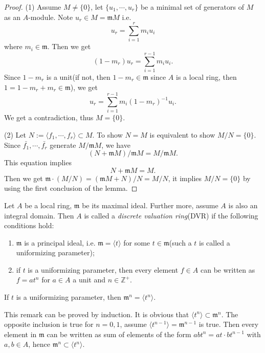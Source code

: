 \begin{proof}
	(1) Assume $ M\neq \lbrace 0 \rbrace $, let $ \lbrace u_1,\cdots,u_r\rbrace $ be a minimal set of generators of $ M $ as an $ A $-module.  Note $ u_r\in M=\mathfrak{m}M $ i.e.
	$$
		u_r=\sum\limits_{i=1}^{r}m_iu_i
	$$
	where $ m_i\in \mathfrak{m} $. Then we get
	$$
		(1-m_r)u_r=\sum\limits_{i=1}^{r-1}m_iu_i.
	$$
	Since $ 1-m_r $ is a unit(if not, then $ 1-m_r \in \mathfrak{m} $ since $A$ is a local ring, then $ 1=1-m_r+m_r\in \mathfrak{m} $), we get
	$$
		u_r=\sum\limits_{i=1}^{r-1}m_i(1-m_r)^{-1}u_i.
	$$
	We get a contradiction, thus $ M=\lbrace 0 \rbrace $.

	(2) Let $ N:=\langle f_1,\cdots,f_r \rangle\subset M $. To show $ N=M $ is equivalent to show $ M/N=\lbrace 0 \rbrace $. Since $ \bar{f_1},\cdots,\bar{f_r} $ generate $ M/\mathfrak{m}M $, we have
	$$
		(N+\mathfrak{m}M)/\mathfrak{m}M=M/\mathfrak{m}M.
	$$
	This equation implies
	$$
		N+\mathfrak{m}M=M.
	$$
	Then we get $ \mathfrak{m}\cdot (M/N)=(\mathfrak{m}M+N)/N=M/N $, it implies $ M/N=\lbrace 0\rbrace $ by using the first conclusion of the lemma.
\end{proof}
\begin{definition}
	Let $ A $ be a local ring, $ \mathfrak{m} $ be its maximal ideal. Further more, assume $ A $ is also an integral domain. Then $ A $ is called a \textit{discrete valuation ring}(DVR)  if the following conditions hold:
	\begin{enumerate}
		\item $ \mathfrak{m} $ is a principal ideal, i.e. $ \mathfrak{m}=\langle t\rangle $ for some $ t\in \mathfrak{m} $(such a $ t $ is called a uniformizing parameter);
		\item if $ t $ is a uniformizing parameter, then every element $ f\in A $ can be written as $ f=at^n $ for $ a\in A $ a unit and  $ n\in \mathbb{Z}^+ $.
	\end{enumerate}
\end{definition}
\begin{remark}
	If $ t $ is a uniformizing parameter, then $ \mathfrak{m}^n=\langle t^n\rangle $.
\end{remark}
This remark can be proved by induction. It is obvious that $ \langle t^n\rangle\subset \mathfrak{m}^n $. The opposite inclusion is true for $ n=0,1 $, assume $ \langle t^{n-1}\rangle =\mathfrak{m}^{n-1} $ is true. Then every element in $ \mathfrak{m} $ can be written as sum of elements of the form $ abt^n=at\cdot b t^{n-1} $ with $ a,b\in A $, hence $ \mathfrak{m}^n\subset \langle t^n\rangle $.

